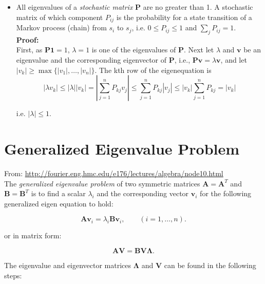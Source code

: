 \documentclass[10pt,b5paper,titlepage]{book}
\begin{document}
\begin{itemize}
\item All eigenvalues of a \textit{stochastic matrix} $\mathbf{P}$ are no greater than 1. A stochastic matrix of which component $P_{ij}$ is the probability for a state transition of a Markov process (chain) from $s_{i}$ to $s_{j}$, i.e. $0 \leq P_{ij} \leq 1$ and $\sum_{j}P_{ij} = 1$.\\

\textbf{Proof: }\\

First, as $\mathbf{P1} = 1$, $\lambda = 1$ is one of the eigenvalues of $\mathbf{P}$. Next let $\lambda$ and $\mathbf{v}$ be an eigenvalue and the corresponding eigenvector of $\mathbf{P}$, i.e., $\mathbf{P} \mathbf{v} = \lambda \mathbf{v}$, and let $|v_{k}| \ge \max\{|v_{1}|, \dots, |v_{n}|\}$. The kth row of the eigenequation is
\begin{equation}
|\lambda v_{k}| \leq |\lambda| |v_{k}| = \left\lvert{\sum_{j=1}^{n}P_{kj}v_{j}}\right\rvert \leq \sum_{j=1}^{n} P_{kj} |v_{j}| \leq  |v_{k}| \sum_{j=1}^{n} P_{kj} = |v_{k}|
\end{equation}

i.e. $|\lambda| \leq 1$.
\end{itemize}



\chapter{Generalized Eigenvalue Problem}

From: \url{http://fourier.eng.hmc.edu/e176/lectures/algebra/node10.html}\\

The \textit{generalized eigenvalue problem} of two symmetric matrices
$\mathbf{A} = \mathbf{A}^{T}$ and $\mathbf{B} = \mathbf{B}^{T}$ is to find a scalar
$\lambda_{i}$ and the corresponding vector $\mathbf{v}_{i}$ for the following
generalized eigen equation to hold:

\begin{equation}
    \mathbf{A}\mathbf{v}_{i} = \lambda_{i}\mathbf{B}\mathbf{v}_{i},
    \qquad (i = 1, \ldots, n)
.\end{equation}

or in matrix form:

\begin{equation}
    \mathbf{A}\mathbf{V} = \mathbf{B}\mathbf{V}\mathbf{\Lambda}
.\end{equation}

The eigenvalue and eigenvector matrices $\mathbf{\Lambda}$ and $\mathbf{V}$ can
be found in the following steps:
\end{document}
